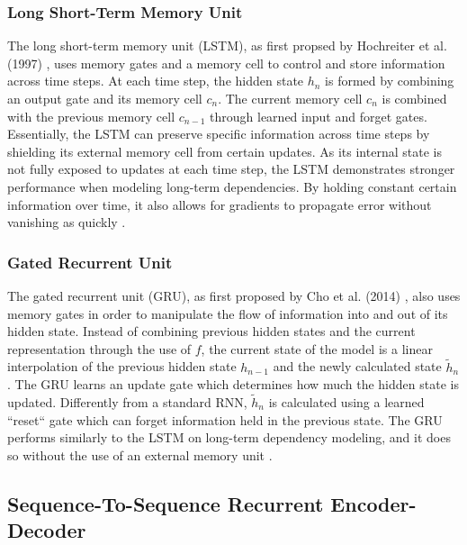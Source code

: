 \documentclass[11pt]{article}
\begin{document}
\subsubsection{Long Short-Term Memory Unit}
The long short-term memory unit (LSTM), as first propsed by Hochreiter et al. (1997) \cite{hochreiter}, uses memory gates and a memory cell to control and store information across time steps. At each time step, the hidden state $h_{n}$ is formed by combining an output gate and its memory cell $c_{n}$. The current memory cell $c_{n}$ is combined with the previous memory cell $c_{n-1}$ through learned input and forget gates. Essentially, the LSTM can preserve specific information across time steps by shielding its external memory cell from certain updates. As its internal state is not fully exposed to updates at each time step, the LSTM demonstrates stronger performance when modeling long-term dependencies. By holding constant certain information over time, it also allows for gradients to propagate error without vanishing as quickly \cite{hochreiter-grad}.

\subsubsection{Gated Recurrent Unit}
The gated recurrent unit (GRU), as first proposed by Cho et al. (2014) \cite{cho}, also uses memory gates in order to manipulate the flow of information into and out of its hidden state. Instead of combining previous hidden states and the current representation through the use of $f$, the current state of the model is a linear interpolation of the previous hidden state $h_{n-1}$ and the newly calculated state $\tilde{h}_{n}$. The GRU learns an update gate which determines how much the hidden state is updated. Differently from a standard RNN, $\tilde{h}_{n}$ is calculated using a learned ``reset`` gate which can forget information held in the previous state. The GRU performs similarly to the LSTM on long-term dependency modeling, and it does so without the use of an external memory unit \cite{chung}.

\subsection{Sequence-To-Sequence Recurrent Encoder-Decoder}
\end{document}
